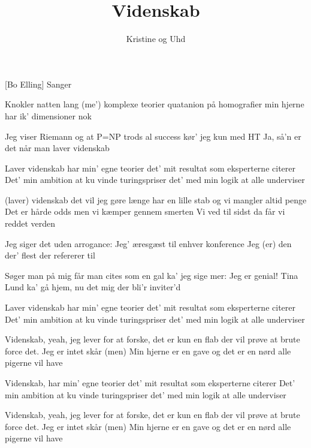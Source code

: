 \documentclass[a4paper,11pt]{article}
\title{Videnskab}
\author{Kristine og Uhd}
\begin{document}
\maketitle

\begin{roles}  
[Bo Elling] Sanger
\end{roles}

\begin{song}
 Knokler natten lang
(me') komplexe teorier
quatanion på homografier
min hjerne har ik' dimensioner nok

 Jeg viser Riemann
og at P=NP
trods al success
kør' jeg kun med HT
Ja, så'n er det når man laver videnskab

 Laver videnskab
har min' egne teorier
det' mit resultat
som eksperterne citerer
Det' min ambition
at ku vinde turingspriser
det' med min logik at
alle underviser

 (laver) videnskab
det vil jeg gøre længe
har en lille stab
og vi mangler altid penge
Det er hårde odds
men vi kæmper gennem smerten
Vi ved til sidst da får vi reddet verden

 Jeg siger det
uden arrogance:
Jeg' æresgæst 
til enhver konference
Jeg (er) den der' flest der refererer til

 Søger man på mig
får man cites som en gal
ka' jeg sige mer:
Jeg er genial!
Tina Lund ka' gå hjem, 
nu det mig der bli'r inviter'd


 Laver videnskab
har min' egne teorier
det' mit resultat
som eksperterne citerer
Det' min ambition
at ku vinde turingspriser
det' med min logik at
alle underviser

 Videnskab, 
yeah, jeg lever for at forske,
det er kun en flab
der vil prøve at brute force det.
Jeg er intet skår
(men) Min hjerne er en gave
og det er en nørd
alle pigerne vil have


 Videnskab,
har min' egne teorier
det' mit resultat
som eksperterne citerer
Det' min ambition
at ku vinde turingspriser
det' med min logik at
alle underviser

 Videnskab, 
yeah, jeg lever for at forske,
det er kun en flab
der vil prøve at brute force det.
Jeg er intet skår
(men) Min hjerne er en gave
og det er en nørd
alle pigerne vil have

\end{song}
\end{document}
